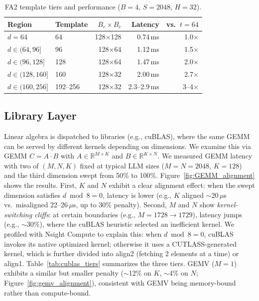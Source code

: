 \documentclass[sigplan,10pt]{acmart}
\begin{document}
\begin{table}[t]
\centering
\caption{FA2 template tiers and performance ($B{=}4$, $S{=}2048$, $H{=}32$).}
\label{tab:fa2_templates}
\small
\setlength{\tabcolsep}{3pt}
\begin{tabular}{@{}llrrr@{}}
\toprule
Region & Template & $B_r \times B_c$ & Latency & vs.\ $t{=}64$ \\
\midrule
$d{=}64$ & 64 & 128$\times$128 & 0.74\,ms & 1.0$\times$ \\
$d \in (64,96]$ & 96 & 128$\times$64 & 1.12\,ms & 1.5$\times$ \\
$d \in (96,128]$ & 128 & 128$\times$64 & 1.47\,ms & 2.0$\times$ \\
$d \in (128,160]$ & 160 & 128$\times$32 & 2.00\,ms & 2.7$\times$ \\
$d \in (160,256]$ & 192--256 & 128$\times$32 & 2.3--2.9\,ms & 3--4$\times$ \\
\bottomrule
\end{tabular}
\end{table}

\subsection{Library Layer}
\label{sec:library}

Linear algebra is dispatched to libraries (e.g., cuBLAS), where the same GEMM can be served by different kernels depending on dimensions.
We examine this via GEMM $C {=} A {\cdot} B$ with $A \in \mathbb{R}^{M \times K}$ and $B \in \mathbb{R}^{K \times N}$.
We measured GEMM latency with two of $(M, N, K)$ fixed at typical LLM sizes ($M{=}N{=}2048$, $K{=}128$) and the third dimension swept from 50\% to 100\%.
Figure~\ref{fig:GEMM_alignment} shows the results.
First, $K$ and $N$ exhibit a clear alignment effect: when the swept dimension satisfies $d \bmod 8 = 0$, latency is lower (e.g., $K$ aligned $\sim$20\,$\mu$s vs.\ misaligned 22--26\,$\mu$s, up to 30\% penalty).
Second, $M$ and $N$ show \emph{kernel-switching cliffs}: at certain boundaries (e.g., $M{=}1728 \to 1729$), latency jumps (e.g., $\sim$30\%), where the cuBLAS heuristic selected an inefficient kernel.
We profiled with Nsight Compute to explain this: when $d \bmod 8 = 0$, cuBLAS invokes its native optimized kernel; otherwise it uses a CUTLASS-generated kernel, which is further divided into align2 (fetching 2 elements at a time) or align1.
Table~\ref{tab:cublas_tiers} summarizes the three tiers. 
GEMV ($M{=}1$) exhibits a similar but smaller penalty (${\sim}$12\% on $K$, ${\sim}$4\% on $N$; Figure~\ref{fig:gemv_alignment}), consistent with GEMV being memory-bound rather than compute-bound.
\end{document}
